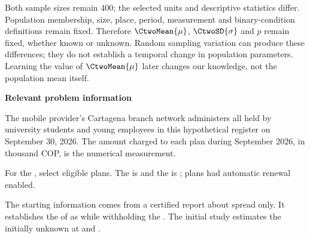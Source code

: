 Both sample sizes remain 400; the selected units and descriptive statistics differ. Population membership, size, place, period, measurement and binary-condition definitions remain fixed. Therefore $\CtwoMean{\mu}$, $\CtwoSD{\sigma}$ and $p$ remain fixed, whether known or unknown. Random sampling variation can produce these differences; they do not establish a temporal change in population parameters. Learning the value of $\CtwoMean{\mu}$ later changes our knowledge, not the population mean itself.

\secInicio[][sec:p2]

\clearpage



\textbf{Relevant problem information}

\begin{probleminfoexcerpt}
The mobile provider's Cartagena branch network administers all      held by university students and young employees in this hypothetical register on September 30, 2026. The amount charged to each plan during September 2026, in thousand COP, is the numerical measurement.
\end{probleminfoexcerpt}

\begin{probleminfoexcerpt}
For the    , select  eligible plans. The    is    and the    is   ;  plans had automatic renewal enabled.
\end{probleminfoexcerpt}

\begin{probleminfoexcerpt}
The starting information comes from a certified report about spread only. It establishes the    of  as    while withholding the   . The initial study estimates the initially unknown    at  and  .
\end{probleminfoexcerpt}

